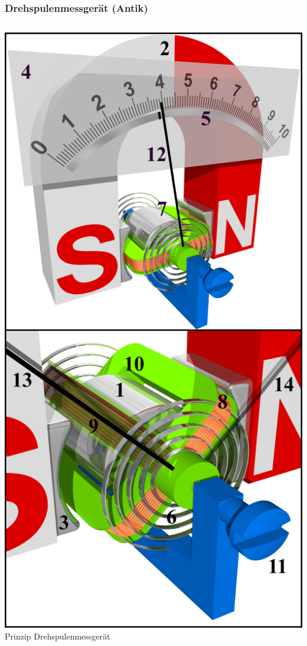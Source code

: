 \begin{frame}
  \frametitle{Drehspulenmessgerät (Antik)}
  \begin{columns}
    \includegraphics[width=.95\textwidth,height=.8\textheight,keepaspectratio]{a16/drehspulenMess.png}\\
    {\tiny Prinzip Drehspulenmessgerät \href{refs}{\cite{wmen}}}

\end{columns}
\end{frame}
